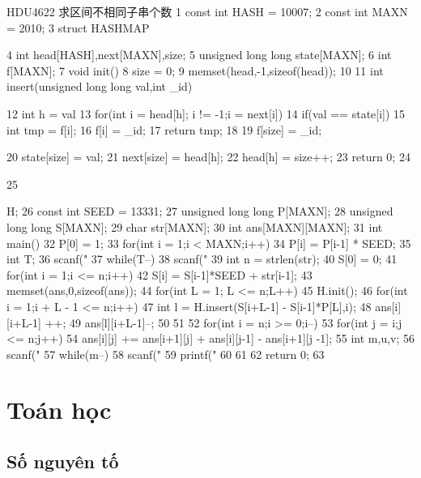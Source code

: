 \documentclass[11pt]{article}
\begin{document}
\begin{Code}
    HDU4622 求区间不相同子串个数
 1 const int HASH = 10007;
 2 const int MAXN = 2010;
 3 struct HASHMAP{
 4     int head[HASH],next[MAXN],size;
 5     unsigned long long state[MAXN];
 6     int f[MAXN];
 7     void init(){
 8         size = 0;
 9         memset(head,-1,sizeof(head));
10     }
11     int insert(unsigned long long val,int _id){
12         int h = val%
13         for(int i = head[h]; i != -1;i = next[i])
14             if(val == state[i]){
15                  int tmp = f[i];
16                  f[i] = _id;
17                  return tmp;
18             }
19         f[size] = _id;


20              state[size] = val;
21              next[size] = head[h];
22              head[h] = size++;
23              return 0;
24       }
25   }H;
26   const int SEED = 13331;
27   unsigned long long P[MAXN];
28   unsigned long long S[MAXN];
29   char str[MAXN];
30   int ans[MAXN][MAXN];
31   int main(){
32       P[0] = 1;
33       for(int i = 1;i < MAXN;i++)
34           P[i] = P[i-1] * SEED;
35       int T;
36       scanf("%
37       while(T--){
38           scanf("%
39           int n = strlen(str);
40           S[0] = 0;
41           for(int i = 1;i <= n;i++)
42               S[i] = S[i-1]*SEED + str[i-1];
43           memset(ans,0,sizeof(ans));
44           for(int L = 1; L <= n;L++){
45               H.init();
46               for(int i = 1;i + L - 1 <= n;i++){
47                   int l = H.insert(S[i+L-1] - S[i-1]*P[L],i);
48                   ans[i][i+L-1] ++;
49                   ans[l][i+L-1]--;
50               }
51           }
52           for(int i = n;i >= 0;i--)
53               for(int j = i;j <= n;j++)
54                   ans[i][j] += ans[i+1][j] + ans[i][j-1] - ans[i+1][j
                        -1];
55           int m,u,v;
56           scanf("%
57           while(m--){
58               scanf("%
59               printf("%
60           }
61       }
62       return 0;
63   }
\end{Code}

\section{Toán học}

\subsection{Số nguyên tố}
\end{document}
